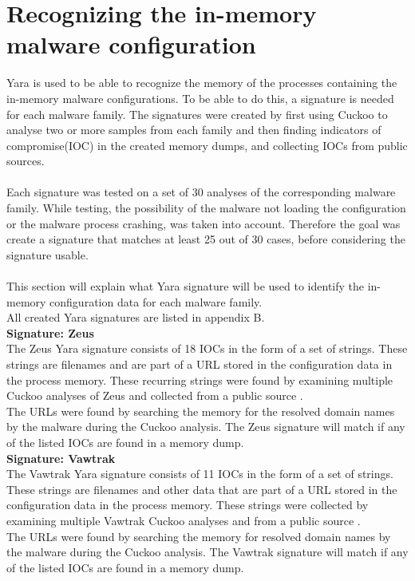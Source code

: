 \documentclass[conference]{IEEEtran}
\begin{document}
\section{Recognizing the in-memory malware configuration}
Yara is used to be able to recognize the memory of the processes containing the in-memory malware configurations. To be able to do this, a signature is needed for each malware family. The signatures were created by first using Cuckoo to analyse two or more samples from each family and then finding indicators of compromise(\Gls{IOC}) in the created memory dumps, and collecting IOCs from public sources. \\\\Each signature was tested on a set of 30 analyses of the corresponding malware family. While testing, the possibility of the malware not loading the configuration or the malware process crashing, was taken into account. Therefore the goal was create a signature that matches at least 25 out of 30 cases, before considering the signature usable. \\\\This section will explain what Yara signature will be used to identify the in-memory configuration data for each malware family.\\ All created Yara signatures are listed in appendix B.\\

\textbf{Signature: Zeus}
\\The Zeus Yara signature consists of 18 IOCs in the form of a set of strings. These strings are filenames and are part of a URL stored in the configuration data in the process memory. These recurring strings were found by examining multiple Cuckoo analyses of Zeus and collected from a public source \cite{zeus-ioc}.\\The URLs were found by searching the memory for the resolved domain names by the malware during the Cuckoo analysis. The Zeus signature will match if any of the listed IOCs are found in a memory dump.\\

\textbf{Signature: Vawtrak}
\\The Vawtrak Yara signature consists of 11 IOCs in the form of a set of strings. These strings are filenames and other data that are part of a URL stored in the configuration data in the process memory. These strings were collected by examining multiple Vawtrak Cuckoo analyses and from a public source \cite{vawtrak-ioc}.\\The URLs were found by searching the memory for resolved domain names by the malware during the Cuckoo analysis. The Vawtrak signature will match if any of the listed IOCs are found in a memory dump.\\
\end{document}
